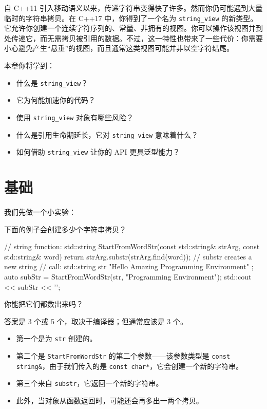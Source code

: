 
自 C++11 引入移动语义以来，传递字符串变得快了许多。然而你仍可能遇到大量临时的字符串拷贝。在 C++17 中，你得到了一个名为 \texttt{string\_view} 的新类型。它允许你创建一个连续字符序列的、常量、非拥有的视图。你可以操作该视图并到处传递它，而无需拷贝被引用的数据。不过，这一特性也带来了一些代价：你需要小心避免产生“悬垂”的视图，而且通常这类视图可能并非以空字符结尾。

本章你将学到：

\begin{itemize}
\item 什么是 \texttt{string\_view}？
\item 它为何能加速你的代码？
\item 使用 \texttt{string\_view} 对象有哪些风险？
\item 什么是引用生命期延长，它对 \texttt{string\_view} 意味着什么？
\item 如何借助 \texttt{string\_view} 让你的 API 更具泛型能力？
\end{itemize}


\section{基础}

我们先做一个小实验：

下面的例子会创建多少个字符串拷贝？

\begin{codebox}[cpp]
// string function:
std::string StartFromWordStr(const std::string& strArg, const std::string& word)
{
return strArg.substr(strArg.find(word)); // substr creates a new string
}
// call:
std::string str {"Hello Amazing Programming Environment" };
auto subStr = StartFromWordStr(str, "Programming Environment");
std::cout << subStr << '\n';
\end{codebox}

你能把它们都数出来吗？

答案是 3 个或 5 个，取决于编译器；但通常应该是 3 个。

\begin{itemize}
\item 第一个是为 \texttt{str} 创建的。
\item 第二个是 \texttt{StartFromWordStr} 的第二个参数——该参数类型是 \texttt{const string\&}，由于我们传入的是 \texttt{const char*}，它会创建一个新的字符串。
\item 第三个来自 \texttt{substr}，它返回一个新的字符串。
\item 此外，当对象从函数返回时，可能还会再多出一两个拷贝。
\end{itemize}

